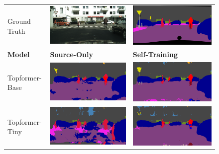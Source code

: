 \documentclass[a4paper,12pt]{report}
\begin{document}
\begin{figure}[]
    \centering
    \begin{tabular}{lll}
        Ground Truth       & \includegraphics[width=.2\linewidth,valign=m]{res/lightweight-uda-baseline-qualitative/image.png}                         & \includegraphics[width=.2\linewidth,valign=m]{res/lightweight-uda-baseline-qualitative/ground-truth.png}                    \\
        \textbf{Model}     & \textbf{Source-Only}                                                                                                      & \textbf{Self-Training}                                                                                                      \\
        Topformer-Base     & \includegraphics[width=.2\linewidth,valign=m]{res/lightweight-uda-baseline-qualitative/topformer-base-sourceonly.png}     & \includegraphics[width=.2\linewidth,valign=m]{res/lightweight-uda-baseline-qualitative/topformer-base-selftraining.png}     \\
        Topformer-Tiny     & \includegraphics[width=.2\linewidth,valign=m]{res/lightweight-uda-baseline-qualitative/topformer-tiny-sourceonly.png}     & \includegraphics[width=.2\linewidth,valign=m]{res/lightweight-uda-baseline-qualitative/topformer-tiny-selftraining.png}     \\

\end{tabular}
\end{figure}
\end{document}
